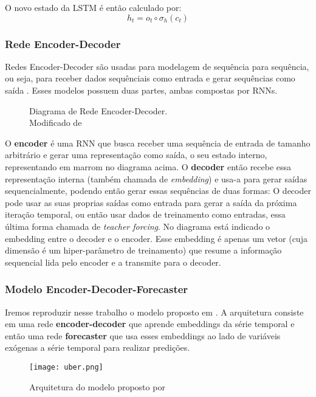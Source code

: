 O novo estado da LSTM é então calculado por: \\
\[h_t = o_t \circ \sigma_h(c_t)\]


\subsubsection{Rede Encoder-Decoder}

Redes Encoder-Decoder são usadas para modelagem de sequência para
sequência, ou seja, para receber dados sequênciais como entrada e gerar
sequências como saída \citep{dlbook}. Esses modelos possuem duas partes, ambas compostas por
RNNs. \\

\begin{figure}[H]
\centering

\caption{ Diagrama de Rede Encoder-Decoder.\\ Modificado de \cite{encdec}}

\end{figure}
  
O \textbf{encoder} é uma RNN que busca receber uma sequência de entrada de
tamanho arbitrário e gerar uma representação como saída, o seu estado interno,
representando em marrom no diagrama acima. O \textbf{decoder} então recebe essa representação interna (também chamada
de \textit{embedding}) e usa-a para gerar saídas sequencialmente, podendo
então gerar essas sequências de duas formas: O decoder pode usar as suas proprias saídas
como entrada para gerar a saída da próxima iteração temporal, ou então usar dados de treinamento como
entradas, essa última forma chamada de \textit{teacher forcing}. No diagrama
está indicado o embedding entre o decoder e o encoder. Esse embedding é apenas
um vetor (cuja dimensão é um hiper-parâmetro de treinamento) que resume a
informação sequencial lida pelo encoder e a transmite para o decoder. 




\subsubsection{Modelo Encoder-Decoder-Forecaster}

Iremos reproduzir nesse trabalho o modelo proposto em \cite{ubertime}. A
arquitetura consiste em uma rede \textbf{encoder-decoder} que aprende embeddings da
série temporal e então uma rede \textbf{forecaster} que usa esses embeddings ao lado de
variáveis exógenas a série temporal para realizar predições.  


\begin{figure}[H]
\centering
\texttt{[image: uber.png]}
\caption{Arquitetura do modelo proposto por \cite{ubertime}}
\end{figure}


